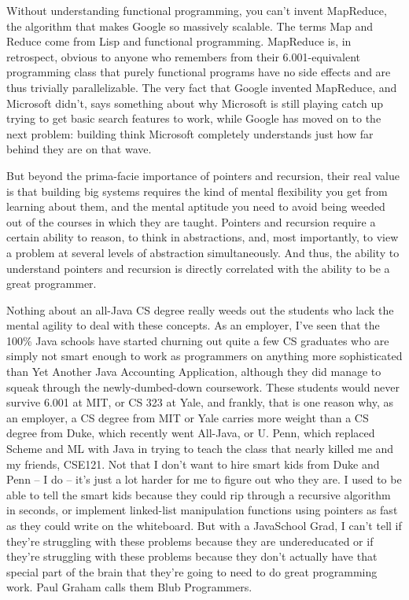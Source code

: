 \documentclass[11pt]{article}
\begin{document}
Without understanding functional programming, you can't invent MapReduce, the
algorithm that makes Google so massively scalable. The terms Map and Reduce come
from Lisp and functional programming. MapReduce is, in retrospect, obvious to
anyone who remembers from their 6.001-equivalent programming class that purely
functional programs have no side effects and are thus trivially parallelizable.
The very fact that Google invented MapReduce, and Microsoft didn't, says
something about why Microsoft is still playing catch up trying to get basic
search features to work, while Google has moved on to the next problem: building
think Microsoft completely understands just how far behind they are on that
wave.

But beyond the prima-facie importance of pointers and recursion, their real
value is that building big systems requires the kind of mental flexibility you
get from learning about them, and the mental aptitude you need to avoid being
weeded out of the courses in which they are taught. Pointers and recursion
require a certain ability to reason, to think in abstractions, and, most
importantly, to view a problem at several levels of abstraction simultaneously.
And thus, the ability to understand pointers and recursion is directly
correlated with the ability to be a great programmer.

Nothing about an all-Java CS degree really weeds out the students who lack the
mental agility to deal with these concepts. As an employer, I've seen that the
100\% Java schools have started churning out quite a few CS graduates who are
simply not smart enough to work as programmers on anything more sophisticated
than Yet Another Java Accounting Application, although they did manage to squeak
through the newly-dumbed-down coursework. These students would never survive
6.001 at MIT, or CS 323 at Yale, and frankly, that is one reason why, as an
employer, a CS degree from MIT or Yale carries more weight than a CS degree from
Duke, which recently went All-Java, or U. Penn, which replaced Scheme and ML
with Java in trying to teach the class that nearly killed me and my friends,
CSE121. Not that I don't want to hire smart kids from Duke and Penn -- I do --
it's just a lot harder for me to figure out who they are. I used to be able to
tell the smart kids because they could rip through a recursive algorithm in
seconds, or implement linked-list manipulation functions using pointers as fast
as they could write on the whiteboard. But with a JavaSchool Grad, I can't tell
if they're struggling with these problems because they are undereducated or if
they're struggling with these problems because they don't actually have that
special part of the brain that they're going to need to do great programming
work. Paul Graham calls them Blub Programmers.
\end{document}
